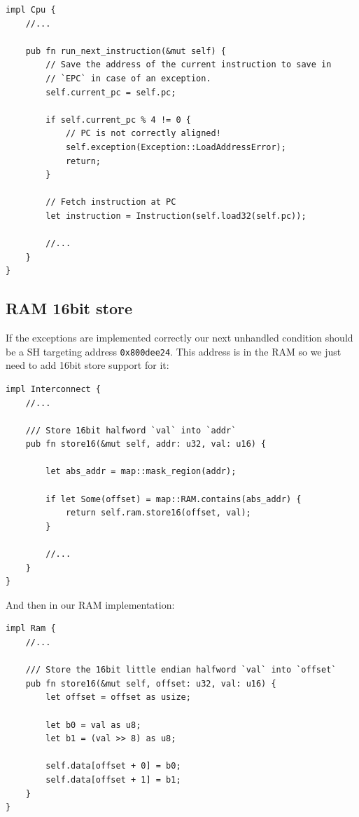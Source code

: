 \documentclass[a4paper]{article}
\newcommand{\code}[1] {\texttt{#1}}
\begin{document}
\begin{lstlisting}
impl Cpu {
    //...

    pub fn run_next_instruction(&mut self) {
        // Save the address of the current instruction to save in
        // `EPC` in case of an exception.
        self.current_pc = self.pc;

        if self.current_pc % 4 != 0 {
            // PC is not correctly aligned!
            self.exception(Exception::LoadAddressError);
            return;
        }

        // Fetch instruction at PC
        let instruction = Instruction(self.load32(self.pc));

        //...
    }
}
\end{lstlisting}

\subsection{RAM 16bit store}

If the exceptions are implemented correctly our next unhandled
condition should be a SH targeting address \code{0x800dee24}. This
address is in the RAM so we just need to add 16bit store support for
it:

\begin{lstlisting}
impl Interconnect {
    //...

    /// Store 16bit halfword `val` into `addr`
    pub fn store16(&mut self, addr: u32, val: u16) {

        let abs_addr = map::mask_region(addr);

        if let Some(offset) = map::RAM.contains(abs_addr) {
            return self.ram.store16(offset, val);
        }

        //...
    }
}
\end{lstlisting}

And then in our RAM implementation:

\begin{lstlisting}
impl Ram {
    //...

    /// Store the 16bit little endian halfword `val` into `offset`
    pub fn store16(&mut self, offset: u32, val: u16) {
        let offset = offset as usize;

        let b0 = val as u8;
        let b1 = (val >> 8) as u8;

        self.data[offset + 0] = b0;
        self.data[offset + 1] = b1;
    }
}
\end{lstlisting}
\end{document}

